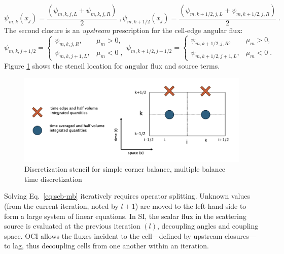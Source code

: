 \begin{subequations}
\begin{equation}
  \psi_{m,k}(x_j) =  \frac{\left( \psi_{m,k,j,L} + \psi_{m,k,j,R} \right)}{2} \;,
\end{equation}
\begin{equation}
  \psi_{m,k+1/2}(x_j) =  \frac{\left( \psi_{m,k+1/2,j,L} + \psi_{m,k+1/2,j,R} \right)}{2} \;.
\end{equation}
\end{subequations}
The second closure is an \textit{upstream} prescription for the cell-edge angular flux:
\begin{subequations}
\begin{equation}
  \psi_{m,k,j+1/2} =
  \begin{cases}
  \psi_{m,k,j,R}, & \mu_m > 0, \\
  \psi_{m,k,j+1,L}, & \mu_m < 0 \;,
  \end{cases}
\end{equation}
\begin{equation}
  \psi_{m,k+1/2,j+1/2} =
  \begin{cases}
  \psi_{m,k+1/2,j,R}, & \mu_m > 0, \\
  \psi_{m,k+1/2,j+1,L}, & \mu_m < 0 \;.
  \end{cases}
\end{equation}
\end{subequations}
Figure \ref{fig:stencil} shows the stencil location for angular flux and source terms. 
\begin{figure}[!htb]
    \centering
    \includegraphics[width=\textwidth]{manuscript2/man2_figs/stencil.png}
    \caption{Discretization stencil for simple corner balance, multiple balance time discretization}
    \label{fig:stencil}
\end{figure}

Solving Eq.~\eqref{eq:scb-mb} iteratively requires operator splitting.
Unknown values (from the current iteration, noted by $l+1$) are moved to the left-hand side to form a large system of linear equations.
In SI, the scalar flux in the scattering source is evaluated at the previous iteration $(l)$, decoupling angles and coupling space.
OCI allows the fluxes incident to the cell---defined by upstream closures---to lag, thus decoupling cells from one another within an iteration.

